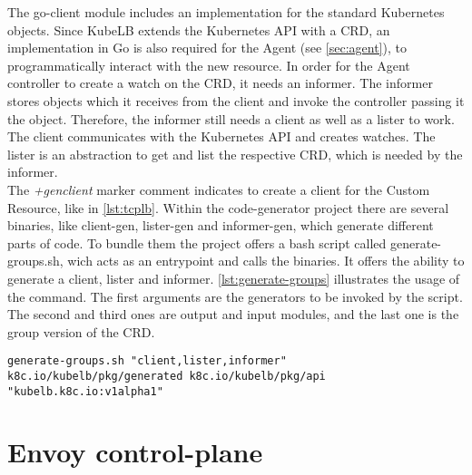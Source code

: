 The go-client module includes an implementation for the standard Kubernetes objects.
Since KubeLB extends the Kubernetes API with a CRD, an implementation in Go is also required for the Agent (see \autoref{sec:agent}), to programmatically interact with the new resource.
In order for the Agent controller to create a watch on the CRD, it needs an informer.
The informer stores objects which it receives from the client and invoke the controller passing it the object.
Therefore, the informer still needs a client as well as a lister to work.
The client communicates with the Kubernetes API and creates watches.
The lister is an abstraction to get and list the respective CRD, which is needed by the informer.
\\
The \textit{+genclient} marker comment indicates to create a client for the Custom Resource, like in \autoref{lst:tcplb}.
Within the code-generator project there are several binaries, like client-gen, lister-gen and informer-gen, which generate different parts of code.
To bundle them the project offers a bash script called generate-groups.sh, wich acts as an entrypoint and calls the binaries.
It offers the ability to generate a client, lister and informer.
\autoref{lst:generate-groups} illustrates the usage of the command.
The first arguments are the generators to be invoked by the script.
The second and third ones are output and input modules, and the last one is the group version of the CRD.

\begin{lstlisting}[numbers=none, caption={Generate client, informer and lister with code-generator}, label={lst:generate-groups}]
	generate-groups.sh "client,lister,informer" k8c.io/kubelb/pkg/generated k8c.io/kubelb/pkg/api "kubelb.k8c.io:v1alpha1"
\end{lstlisting}

\section{Envoy control-plane}\label{sec:envoy-control-plane}

